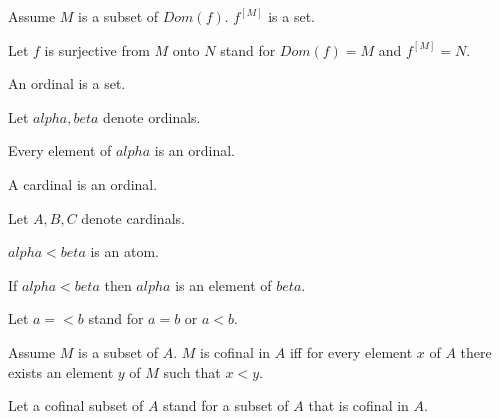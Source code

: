 \documentclass{document}
\begin{document}
\begin{forthel}
    \begin{axiom}
      Assume $M$ is a subset of $Dom(f)$. $f^[M]$ is a set.
    \end{axiom}

    Let $f$ is surjective from $M$ onto $N$ stand for $Dom(f) = M$ and $f^[M] = N$.

    \begin{signature}
      An ordinal is a set.
    \end{signature}

    Let $alpha, beta$ denote ordinals.

    \begin{axiom}
      Every element of $alpha$ is an ordinal.
    \end{axiom}

    \begin{signature}
      A cardinal is an ordinal.
    \end{signature}

    Let $A,B,C$ denote cardinals.

    \begin{signature}
      $alpha < beta$ is an atom.
    \end{signature}

    \begin{axiom}
      If $alpha < beta$ then $alpha$ is an element of $beta$.
    \end{axiom}

    Let $a =< b$ stand for $a = b$ or $a < b$.

    \begin{definition}
      Assume $M$ is a subset of $A$. $M$ is cofinal in $A$ iff for every element $x$ of $A$ there exists an element $y$ of $M$ such that $x < y$.
    \end{definition}

    Let a cofinal subset of $A$ stand for a subset of $A$ that is cofinal in $A$.

\end{forthel}
\end{document}
